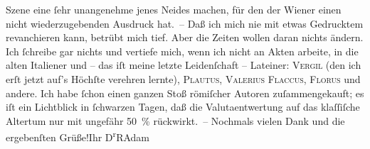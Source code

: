 \begin{ledgroupsized}[t]{13cm}
               Szene eine ſehr unangenehme jenes Neides machen, für den der Wiener einen nicht wiederzugebenden Ausdruck hat. –\pend
           \pstart
           Daß ich mich nie mit etwas Gedrucktem revanchieren kann, betrübt mich tief. Aber die
               Zeiten wollen daran nichts ändern. Ich ſchreibe gar nichts und vertiefe mich, wenn
               ich nicht an Akten arbeite, in die alten Italiener und – das iſt meine letzte Leidenſchaft – Lateiner: \textsc{Vergil} (den ich erſt jetzt auf's Höchſte verehren lernte), \textsc{Plautus}, \textsc{Valerius Flaccus}, \textsc{Florus} und andere. Ich habe ſchon einen ganzen Stoß römiſcher Autoren zuſammengekauft;
               es iſt ein Lichtblick in ſchwarzen Tagen, daß die Valutaentwertung auf das klaſſiſche
               Altertum nur mit ungefähr 50 {\%} rückwirkt. –\pend
           \pstart
           Nochmals vielen Dank und die ergebenſten Grüße!\hspace*{3.5em}Ihr\pend
           \pstart \spacefill\mbox{D\textsuperscript{r}RAdam}\pend{}
         
         \endnumbering{}\end{ledgroupsized}  \newcommand{\dateiname}{L02335}\newcommand{\titel}{Robert Adam an Arthur Schnitzler, 13. 2. 1920}\newcommand{\editorInnen}{Martin Anton Müller und Gerd-Hermann Susen}
      